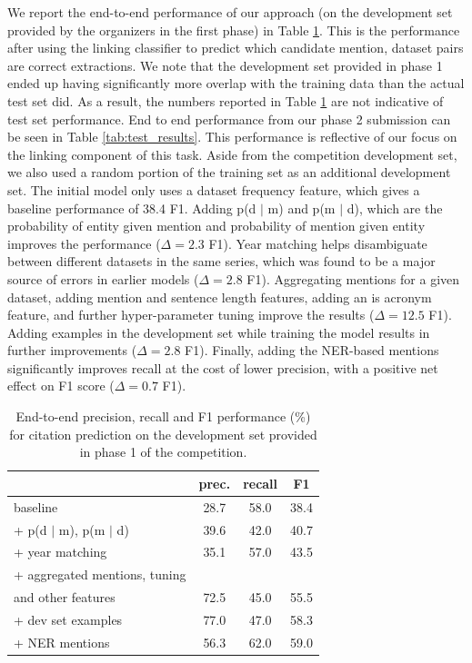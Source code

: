 \documentclass[11pt]{article}
\newcommand{\wacomment}[1]{\textcolor{blue}{[#1 \textsc{--Waleed}]}}
\newcommand{\dkcomment}[1]{\textcolor{red}{[#1 \textac{--DK}]}}
\begin{document}
We report the end-to-end performance of our approach (on the development set provided by the organizers in the first phase) in Table \ref{tab:e2e_results}. This is the performance after using the linking classifier to predict which candidate mention, dataset pairs are correct extractions.
We note that the development set provided in phase 1 ended up having significantly more overlap with the training data than the actual test set did. As a result, the numbers reported in Table \ref{tab:e2e_results} are not indicative of test set performance. End to end performance from our phase 2 submission can be seen in Table \ref{tab:test_results}. This performance is reflective of our focus on the linking component of this task. Aside from the competition development set, we also used a random portion of the training set as an additional development set.
The initial model only uses a dataset frequency feature, which gives a baseline performance of 38.4 F1. Adding p(d $\mid$ m) and p(m $\mid$ d), which are the probability of entity given mention and probability of mention given entity improves the performance ($\Delta = 2.3$ F1).
Year matching helps disambiguate between different datasets in the same series, which was found to be a major source of errors in earlier models ($\Delta = 2.8$ F1).
Aggregating mentions for a given dataset, adding mention and sentence length features, adding an is acronym feature, and further hyper-parameter tuning improve the results ($\Delta = 12.5$ F1).
Adding examples in the development set while training the model results in further improvements ($\Delta = 2.8$ F1).
Finally, adding the NER-based mentions significantly improves recall at the cost of lower precision, with a positive net effect on F1 score ($\Delta = 0.7$ F1).

\begin{table}[t]
\centering
\setlength{\tabcolsep}{2pt}
\begin{tabular}{@{}lccc@{}}
\toprule
                  & prec. & recall & F1 \\ \midrule
baseline               & 28.7 & 58.0 & 38.4 \\
+ p(d $\mid$ m), p(m $\mid$ d)  & 39.6 & 42.0 & 40.7 \\
+ year matching        & 35.1 & 57.0 & 43.5 \\
+ aggregated mentions, tuning  & & & \\
\quad and other features & 72.5 & 45.0 & 55.5 \\
+ dev set examples     & 77.0 & 47.0 & 58.3 \\ 
+ NER mentions         & 56.3 & 62.0 & 59.0 \\ \bottomrule
\end{tabular}
\caption{End-to-end precision, recall and F1 performance (\%) for citation prediction on the development set provided in phase 1 of the competition. 
}
\label{tab:e2e_results}
\end{table}
\end{document}
